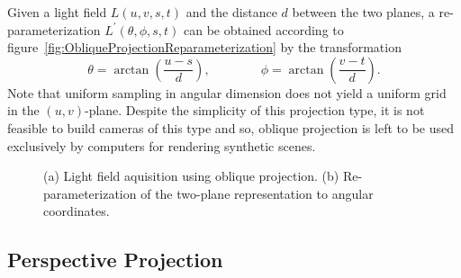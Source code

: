 Given a light field $L(u, v, s, t)$ and the distance $d$ between the two planes, a re-parameterization $L^{\prime}(\theta, \phi, s, t)$ can be obtained according to figure~\ref{fig:ObliqueProjectionReparameterization} by the transformation
\begin{equation}
		\theta = \arctan\left(\frac{u - s}{d}\right), 
		\qquad \qquad
		\phi = \arctan\left(\frac{v - t}{d}\right).
\end{equation}
Note that uniform sampling in angular dimension does not yield a uniform grid in the $(u, v)$-plane.
Despite the simplicity of this projection type, it is not feasible to build cameras of this type and so, oblique projection is left to be used exclusively by computers for rendering synthetic scenes.

\begin{figure}[tb]
	\subfigure[]{
		\centering
		
		\label{fig:ObliqueProjection}
	}
	\hfill
	\subfigure[]{
		\centering
		
		\label{fig:ObliqueProjectionReparameterization}
	}
	\caption{(a) Light field aquisition using oblique projection. (b) Re-parameterization of the two-plane representation to angular coordinates.}
\end{figure}

\subsection*{Perspective Projection}

